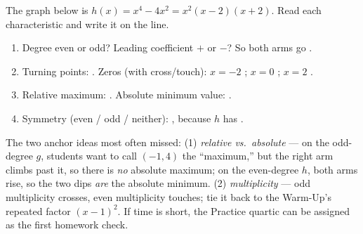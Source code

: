 \documentclass[10pt]{article}
\newcommand{\lgrid}[4]{%
  \draw[step=1, linegray!40, very thin] (#1,#3) grid (#2,#4);
  \draw[->, semithick, charcoal] (#1,0)--(#2,0) node[below right, font=\scriptsize]{$x$};
  \draw[->, semithick, charcoal] (0,#3)--(0,#4) node[left, font=\scriptsize]{$y$};}
\begin{document}
\begin{practicebox}
The graph below is $h(x) = x^4 - 4x^2 = x^2(x-2)(x+2)$. Read each characteristic and write it on the
line.
\begin{center}
\end{center}
\begin{enumerate}[leftmargin=1.6em, itemsep=3pt]
  \item Degree even or odd?  \quad Leading coefficient $+$ or $-$? \ans{$+$} \quad
        So both arms go .
  \item Turning points: . \quad Zeros (with cross/touch): $x=-2$ ;
        $x=0$ ; $x=2$ .
  \item Relative maximum: . \quad Absolute minimum value: .
  \item Symmetry (even / odd / neither): , because $h$ has .
\end{enumerate}
\end{practicebox}

\begin{teachernote}
The two anchor ideas most often missed: (1) \emph{relative vs.\ absolute} --- on the odd-degree
$g$, students want to call $(-1,4)$ the ``maximum,'' but the right arm climbs past it, so there is
\emph{no} absolute maximum; on the even-degree $h$, both arms rise, so the two dips \emph{are} the
absolute minimum. (2) \emph{multiplicity} --- odd multiplicity crosses, even multiplicity touches;
tie it back to the Warm-Up's repeated factor $(x-1)^2$. If time is short, the Practice quartic can be
assigned as the first homework check.
\end{teachernote}
\end{document}

